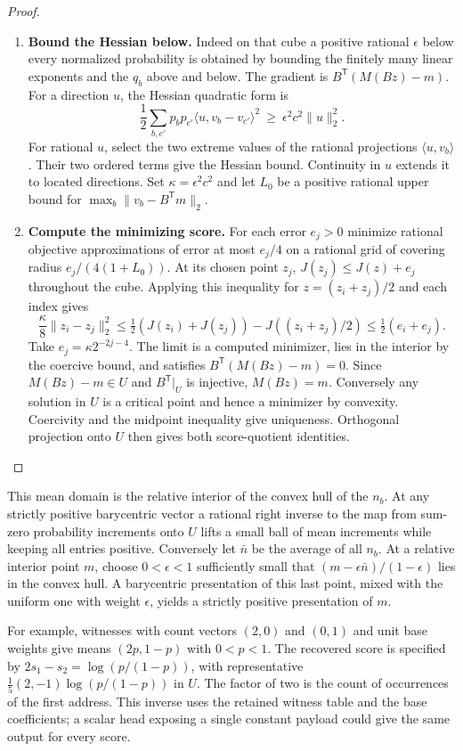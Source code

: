 \documentclass[11pt,a4paper]{article}
\theoremstyle{definition}
\theoremstyle{remark}\newaliascnt{remark}{theorem}
\numberwithin{equation}{section}
\begin{document}
\begin{proof}
\begin{enumerate}[titledsteps]
    \item \textbf{Bound the Hessian below.} Indeed on that cube a positive rational $\epsilon$ below every normalized probability is obtained by bounding the finitely many linear exponents and the $q_b$ above and below. The gradient is $B^{\mathsf{T}}(M(Bz)-m)$. For a direction $u$, the Hessian quadratic form is
\[
 \frac12\sum_{b,c'}p_b p_{c'}\langle u,v_b-v_{c'}\rangle^2
 \ \ge\ \epsilon^2 c^2\|u\|_2^2.
\]
For rational \(u\), select the two extreme values of the rational projections \(\langle u,v_b\rangle\). Their two ordered terms give the Hessian bound. Continuity in \(u\) extends it to located directions. Set \(\kappa=\epsilon^2c^2\) and let \(L_0\) be a positive rational upper bound for \(\max_b\|v_b-B^{\mathsf T}m\|_2\). 
    \item \textbf{Compute the minimizing score.} For each error \(e_j>0\) minimize rational objective approximations of error at most \(e_j/4\) on a rational grid of covering radius \(e_j/(4(1+L_0))\). At its chosen point \(z_j\), \(J(z_j)\le J(z)+e_j\) throughout the cube. Applying this inequality for \(z=(z_i+z_j)/2\) and each index gives
\[
 \frac{\kappa}{8}\|z_i-z_j\|_2^2
 \le \tfrac12(J(z_i)+J(z_j))-J((z_i+z_j)/2)
 \le \tfrac12(e_i+e_j).
\]
Take \(e_j=\kappa2^{-2j-4}\). The limit is a computed minimizer, lies in the interior by the coercive bound, and satisfies \(B^{\mathsf T}(M(Bz)-m)=0\). Since \(M(Bz)-m\in U\) and \(B^{\mathsf T}|_U\) is injective, \(M(Bz)=m\). Conversely any solution in \(U\) is a critical point and hence a minimizer by convexity. Coercivity and the midpoint inequality give uniqueness. Orthogonal projection onto \(U\) then gives both score-quotient identities.\qedhere
\end{enumerate}
\end{proof}
This mean domain is the relative interior of the convex hull of the $n_b$. At any strictly positive barycentric vector a rational right inverse to the map from sum-zero probability increments onto $U$ lifts a small ball of mean increments while keeping all entries positive. Conversely let $\bar n$ be the average of all $n_b$. At a relative interior point $m$, choose $0<\epsilon<1$ sufficiently small that $(m-\epsilon\bar n)/(1-\epsilon)$ lies in the convex hull. A barycentric presentation of this last point, mixed with the uniform one with weight $\epsilon$, yields a strictly positive presentation of $m$.

For example, witnesses with count vectors $(2,0)$ and $(0,1)$ and unit base weights give means $(2p,1-p)$ with $0<p<1$. The recovered score is specified by $2s_1-s_2=\log(p/(1-p))$, with representative $\frac15(2,-1)\log(p/(1-p))$ in $U$. The factor of two is the count of occurrences of the first address. This inverse uses the retained witness table and the base coefficients; a scalar head exposing a single constant payload could give the same output for every score.
\end{document}
